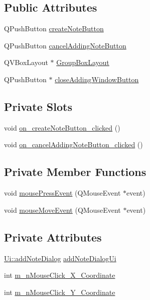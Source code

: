 \subsection*{Public Attributes}
\begin{DoxyCompactItemize}
\item 
Q\+Push\+Button \hyperlink{classaddNoteDialog_ae424f90e2d41fa5ec323d4c93a91f527}{create\+Note\+Button}
\item 
Q\+Push\+Button \hyperlink{classaddNoteDialog_a05ecc54eb7cba0d6ffbc5cabc8a4f551}{cancel\+Adding\+Note\+Button}
\item 
Q\+V\+Box\+Layout $\ast$ \hyperlink{classaddNoteDialog_aec3ffbbf5c9ceebc839678cb1c842499}{Group\+Box\+Layout}
\item 
Q\+Push\+Button $\ast$ \hyperlink{classaddNoteDialog_af1d9adf48985dc8ca2ec30c60c3d569e}{close\+Adding\+Window\+Button}
\end{DoxyCompactItemize}
\subsection*{Private Slots}
\begin{DoxyCompactItemize}
\item 
void \hyperlink{classaddNoteDialog_a67b28dc05851888a45774eb240d6e43d}{on\+\_\+create\+Note\+Button\+\_\+clicked} ()
\item 
void \hyperlink{classaddNoteDialog_af0e53e8f605b12087a3982e53409ca2f}{on\+\_\+cancel\+Adding\+Note\+Button\+\_\+clicked} ()
\end{DoxyCompactItemize}
\subsection*{Private Member Functions}
\begin{DoxyCompactItemize}
\item 
void \hyperlink{classaddNoteDialog_a5479e71fa86229b5d3a2e03ffd3ddbeb}{mouse\+Press\+Event} (Q\+Mouse\+Event $\ast$event)
\item 
void \hyperlink{classaddNoteDialog_a56670c6227c03bc1277f22789e7876e4}{mouse\+Move\+Event} (Q\+Mouse\+Event $\ast$event)
\end{DoxyCompactItemize}
\subsection*{Private Attributes}
\begin{DoxyCompactItemize}
\item 
\hyperlink{classUi_1_1addNoteDialog}{Ui\+::add\+Note\+Dialog} \hyperlink{classaddNoteDialog_a4fd2dea6a480150e92f58bc0d415a83e}{add\+Note\+Dialog\+Ui}
\item 
int \hyperlink{classaddNoteDialog_af54413cf6c84a6610266d9c616f44541}{m\+\_\+n\+Mouse\+Click\+\_\+\+X\+\_\+\+Coordinate}
\item 
int \hyperlink{classaddNoteDialog_aeb0351ab1bbcc76899f21224ddf4d374}{m\+\_\+n\+Mouse\+Click\+\_\+\+Y\+\_\+\+Coordinate}
\end{DoxyCompactItemize}


